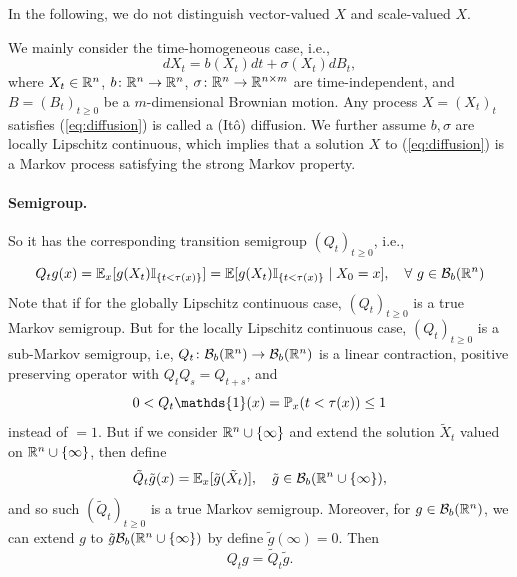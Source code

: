 In the following, we do not distinguish vector-valued $X$ and scale-valued $X$.

We mainly consider the time-homogeneous case, i.e.,
\begin{equation*}\label{eq:diffusion}
    dX_t = b(X_t)dt + \sigma(X_t)dB_t,
\end{equation*}
where $X_t \in \mathbb{R}^n$, $b\colon \mathbb{R}^{n} \rightarrow \mathbb{R}^n$, $\sigma \colon \mathbb{R}^{n} \rightarrow \mathbb{R}^{n\times m}$ are time-independent, and $B = (B_t)_{t \geq 0}$ be a $m$-dimensional Brownian motion. Any process $X = (X_t)_{t}$ satisfies (\ref{eq:diffusion}) is called a (It\^o) diffusion. We further assume $b,\sigma$ are locally Lipschitz continuous, which implies that a solution $X$ to (\ref{eq:diffusion}) is a Markov process satisfying the strong Markov property. 

\paragraph{Semigroup.} So it has the corresponding transition semigroup $(Q_t)_{t \geq 0}$, i.e.,
\begin{equation*}
    Q_tg(x) = \mathbb{E}_x[g(X_t)\mathbb{I}_{\left\{t < \tau(x)\right\}}] = \mathbb{E}[g(X_t)\mathbb{I}_{\left\{t < \tau(x)\right\}} \mid X_0 = x],\quad \forall~g \in \mathcal{B}_b(\mathbb{R}^n)
\end{equation*}
Note that if for the globally Lipschitz continuous case, $(Q_t)_{t \geq 0}$ is a true Markov semigroup. But for the locally Lipschitz continuous case, $(Q_t)_{t \geq 0}$ is a sub-Markov semigroup, i.e, $Q_t \colon \mathcal{B}_b(\mathbb{R}^n) \rightarrow \mathcal{B}_b(\mathbb{R}^n)$ is a linear contraction, positive preserving operator with $Q_tQ_s = Q_{t+s}$, and
\begin{equation*}
    0 < Q_t\mathds{1}(x) = \Pb_x(t < \tau(x)) \leq 1
\end{equation*}
instead of $= 1$. But if we consider $\mathbb{R}^n \cup \left\{\infty\right\}$ and extend the solution $\tilde{X}_t$ valued on $\mathbb{R}^n \cup \left\{\infty\right\}$, then define
\begin{equation*}
    \tilde{Q}_t\tilde{g}(x) = \mathbb{E}_x[\tilde{g}(\tilde{X}_t)],\quad \tilde{g} \in \mathcal{B}_b(\mathbb{R}^n \cup \left\{\infty\right\}),
\end{equation*}
and so such $(\tilde{Q}_t)_{t \geq 0}$ is a true Markov semigroup. Moreover, for $g \in \mathcal{B}_b(\mathbb{R}^n)$, we can extend $g$ to $\tilde{g} \mathcal{B}_b(\mathbb{R}^n \cup \left\{\infty\right\})$ by define $\tilde{g}(\infty) = 0$. Then
\begin{equation*}
    Q_tg = \tilde{Q}_t\tilde{g}.
\end{equation*}

